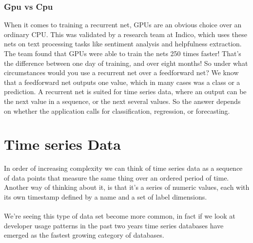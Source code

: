 \documentclass{article}
\begin{document}
    \subsubsection{Gpu vs Cpu}
    When it comes to training a recurrent net, GPUs are an obvious choice over an ordinary CPU. This was validated by a research team at Indico, which uses these nets on text processing tasks like sentiment analysis and helpfulness extraction. The team found that GPUs were able to train the nets 250 times faster! That’s the difference between one day of training, and over eight months! So under what circumstances would you use a recurrent net over a feedforward net? We know that a feedforward net outputs one value, which in many cases was a class or a prediction. A recurrent net is suited for time series data, where an output can be the next value in a sequence, or the next several values. So the answer depends on whether the application calls for classification, regression, or forecasting.

  \newpage
  \section{Time series Data}
    \paragraph{}
    In order of increasing complexity we can think of time series data as a sequence of data points that measure the same thing over an ordered period of time. Another way of thinking about it, is that it's a series of numeric values, each with its own timestamp defined by a name and a set of label dimensions.
    \paragraph{} 
    We're seeing this type of data set become more common, in fact if we look at developer usage patterns in the past two years time series databases have emerged as the fastest growing category of databases.
    
    
    
\end{document}
